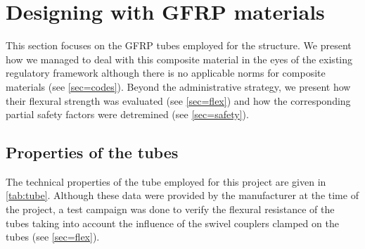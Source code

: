 \section{Designing with GFRP materials}\label{sec=design_gfrp}
This section focuses on the GFRP tubes employed for the structure. We present how we managed to deal with this composite material in the eyes of the existing regulatory framework although there is no applicable norms for composite materials (see \cref{sec=codes}). Beyond the administrative strategy, we present how their flexural strength was evaluated (see \cref{sec=flex}) and how the corresponding partial safety factors were detremined (see \cref{sec=safety}).

\subsection{Properties of the tubes}\label{sec=gfrp}
The technical properties of the tube employed for this project are given in \cref{tab:tube}. Although these data were provided by the manufacturer at the time of the project, a test campaign was done to verify the flexural resistance of the tubes taking into account the influence of the swivel couplers clamped on the tubes (see \cref{sec=flex}).
